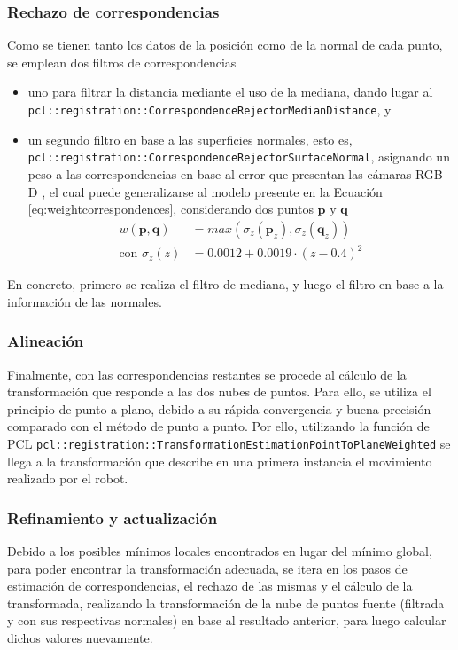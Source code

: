\subsubsection{Rechazo de correspondencias}
Como se tienen tanto los datos de la posición como de la normal de cada punto, se emplean dos filtros de correspondencias
\begin{itemize}
    \item uno para filtrar la distancia mediante el uso de la mediana, dando lugar al \lstinline{pcl::registration::CorrespondenceRejectorMedianDistance}, y
    \item  un segundo filtro en base a las superficies normales, esto es, \lstinline{pcl::registration::CorrespondenceRejectorSurfaceNormal}, asignando un peso a las correspondencias en base al error que presentan las cámaras RGB-D \cite{nguyen2012}, el cual puede generalizarse al modelo presente en la Ecuación \ref{eq:weightcorrespondences}, considerando dos puntos $\bm{p}$ y $\bm{q}$
    \begin{align}
        w(\bm{p},\bm{q}) &= max(\sigma_z({\bm{p}_z}), \sigma_z(\bm{q}_z))
        \label{eq:weightcorrespondences} \\
        \text{con }\sigma_z(z) &= 0.0012+0.0019\cdot (z-0.4)^2
    \end{align}
\end{itemize}

En concreto, primero se realiza el filtro de mediana, y luego el filtro en base a la información de las normales.

\subsubsection{Alineación}
Finalmente, con las correspondencias restantes se procede al cálculo de la transformación que responde a las dos nubes de puntos. Para ello, se utiliza el principio de punto a plano, debido a su rápida convergencia y buena precisión comparado con el método de punto a punto. Por ello, utilizando la función de PCL \lstinline{pcl::registration::TransformationEstimationPointToPlaneWeighted} se llega a la transformación que describe en una primera instancia el movimiento realizado por el robot.

\subsubsection{Refinamiento y actualización}
Debido a los posibles mínimos locales encontrados en lugar del mínimo global, para poder encontrar la transformación adecuada, se itera en los pasos de estimación de correspondencias, el rechazo de las mismas y el cálculo de la transformada, realizando la transformación de la nube de puntos fuente (filtrada y con sus respectivas normales) en base al resultado anterior, para luego calcular dichos valores nuevamente.

